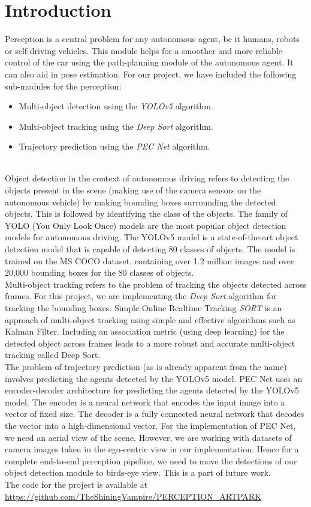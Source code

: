 \documentclass[conference]{IEEEtran}
\begin{document}
\section{Introduction}
Perception is a central problem for any autonomous agent, be it humans, robots or self-driving vehicles. This module helps for a smoother and more reliable control of the car using the path-planning module of the autonomous agent. It can also aid in pose estimation. For our project, we have included the following sub-modules for the perception:
\begin{itemize}
  \item Multi-object detection using the \textit{YOLOv5} algorithm.
  \item Multi-object tracking using the \textit{Deep Sort} algorithm.
  \item Trajectory prediction using the \textit{PEC Net} algorithm.
\end{itemize} \\
Object detection in the context of autonomous driving refers to detecting the objects present in the scene (making use of the camera sensors on the autonomous vehicle) by making bounding boxes surrounding the detected objects. This is followed by identifying the class of the objects. The family of YOLO (You Only Look Once) models are the most popular object detection models for autonomous driving. The YOLOv5 model is a state-of-the-art object detection model that is capable of detecting 80 classes of objects. The model is trained on the MS COCO dataset, containing over 1.2 million images and over 20,000 bounding boxes for the 80 classes of objects. \\
Multi-object tracking refers to the problem of tracking the objects detected across frames. For this project, we are implementing the \textit{Deep Sort} algorithm for tracking the bounding boxes. Simple Online Realtime Tracking \textit{SORT} is an approach of multi-object tracking using simple and effective algorithms such as Kalman Filter. Including an association metric (using deep learning) for the detected object across frames leads to a more robust and accurate multi-object tracking called Deep Sort. \\
The problem of trajectory prediction (as is already apparent from the name) involves predicting the agents detected by the YOLOv5 model. PEC Net uses an encoder-decoder architecture for predicting the agents detected by the YOLOv5 model. The encoder is a neural network that encodes the input image into a vector of fixed size. The decoder is a fully connected neural network that decodes the vector into a high-dimensional vector. For the implementation of PEC Net, we need an aerial view of the scene. However, we are working with datasets of camera images taken in the ego-centric view in our implementation. Hence for a complete end-to-end perception pipeline, we need to move the detections of our object detection module to birds-eye view. This is a part of future work. \\
The code for the project is available at \url{https://github.com/TheShiningVampire/PERCEPTION_ARTPARK}
\end{document}
